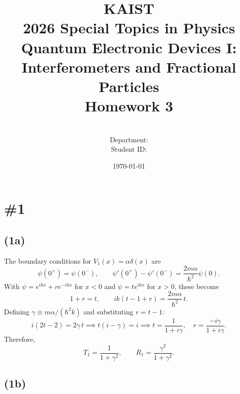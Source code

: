 \documentclass[a4paper,11pt]{article}
\title{KAIST\\2026 Special Topics in Physics Quantum Electronic Devices I: Interferometers and Fractional Particles\\
Homework 3\bigskip}
\author{\textbf{\Large \name} \\
Department: \department\\
Student ID: \studentid}
\date{\today}
\begin{document}
\thispagestyle{empty}
\maketitle
\tableofcontents
{}
\setcounter{secnumdepth}{1}
\setcounter{tocdepth}{2}

\newcommand{\tr}{\operatorname{tr}}
\newcommand{\sgn}{\operatorname{sgn}}
\newcommand{\supp}{\operatorname{supp}}
\renewcommand{\Re}{\operatorname{Re}}
\renewcommand{\Im}{\operatorname{Im}}
\newcommand{\boltz}{k_{\mathrm{B}}}

\section{\#1}
\subsection{(1a)}

The boundary conditions for $V_1(x) = \alpha\delta(x)$ are
\begin{equation}
    \psi(0^+) = \psi(0^-), \qquad \psi'(0^+) - \psi'(0^-) = \frac{2m\alpha}{\hbar^2}\psi(0).
\end{equation}
With $\psi = e^{ikx} + re^{-ikx}$ for $x < 0$ and $\psi = te^{ikx}$ for $x > 0$, these become
\begin{equation}
    1 + r = t, \qquad ik(t - 1 + r) = \frac{2m\alpha}{\hbar^2}\,t.
\end{equation}
Defining $\gamma \equiv m\alpha/(\hbar^2 k)$ and substituting $r = t - 1$:
\begin{equation}
    i(2t - 2) = 2\gamma\, t \implies t(i - \gamma) = i \implies t = \frac{1}{1 + i\gamma}, \quad r = \frac{-i\gamma}{1 + i\gamma}.
\end{equation}
Therefore,
\begin{equation}
    T_1 = \frac{1}{1 + \gamma^2}, \qquad R_1 = \frac{\gamma^2}{1 + \gamma^2}.
\end{equation}


\subsection{(1b)}
\end{document}
